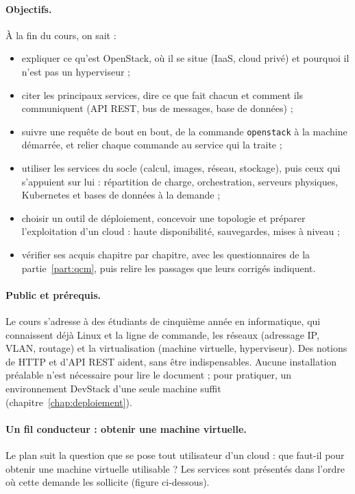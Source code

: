 \paragraph{Objectifs.} À la fin du cours, on sait :
\begin{itemize}
  \item expliquer ce qu'est OpenStack, où il se situe (IaaS, cloud privé) et pourquoi il n'est pas un hyperviseur ;
  \item citer les principaux services, dire ce que fait chacun et comment ils communiquent (API REST, bus de messages, base de
        données) ;
  \item suivre une requête de bout en bout, de la commande \texttt{openstack} à la machine démarrée, et relier chaque commande au
        service qui la traite ;
  \item utiliser les services du socle (calcul, images, réseau, stockage), puis ceux qui s'appuient sur lui : répartition de charge,
        orchestration, serveurs physiques, Kubernetes et bases de données à la demande ;
  \item choisir un outil de déploiement, concevoir une topologie et préparer l'exploitation d'un cloud : haute disponibilité,
        sauvegardes, mises à niveau ;
  \item vérifier ses acquis chapitre par chapitre, avec les questionnaires de la partie~\ref{part:qcm}, puis relire les passages
        que leurs corrigés indiquent.
\end{itemize}

\paragraph{Public et prérequis.} Le cours s'adresse à des étudiants de cinquième année en informatique, qui connaissent déjà
Linux et la ligne de commande, les réseaux (adressage IP, VLAN, routage) et la virtualisation (machine virtuelle, hyperviseur). Des
notions de HTTP et d'API REST aident, sans être indispensables. Aucune installation préalable n'est nécessaire pour lire le
document ; pour pratiquer, un environnement DevStack d'une seule machine suffit (chapitre~\ref{chap:deploiement}).

\paragraph{Un fil conducteur : obtenir une machine virtuelle.} Le plan suit la question que se pose tout utilisateur d'un cloud :
que faut-il pour obtenir une machine virtuelle utilisable ? Les services sont présentés dans l'ordre où cette demande les sollicite
(figure ci-dessous).


